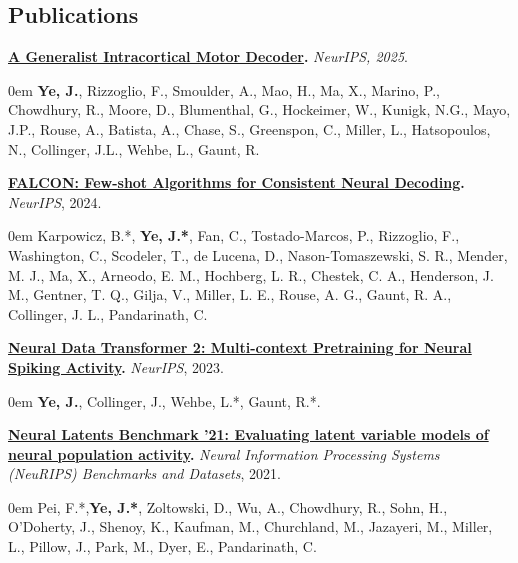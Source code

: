 \subsection*{Publications}

    \textbf{\href{https://www.biorxiv.org/content/10.1101/2024.09.15.613126v2}
    {A Generalist Intracortical Motor Decoder}.} \emph{NeurIPS, 2025}.

    \begin{addmargin}[1em]{0em}
        \textbf{Ye, J.}, Rizzoglio, F., Smoulder, A., Mao, H., Ma, X., Marino, P., Chowdhury, R., Moore, D., Blumenthal, G., Hockeimer, W., Kunigk, N.G., Mayo, J.P., Rouse, A., Batista, A., Chase, S., Greenspon, C., Miller, L., Hatsopoulos, N., Collinger, J.L., Wehbe, L., Gaunt, R.
    \end{addmargin}


    \textbf{\href{https://www.biorxiv.org/content/10.1101/2024.09.15.613126v2}
    {FALCON: Few-shot Algorithms for Consistent Neural Decoding}.} \emph{NeurIPS}, 2024.

    \begin{addmargin}[1em]{0em}
        Karpowicz, B.*, \textbf{Ye, J.*}, Fan, C., Tostado-Marcos, P., Rizzoglio, F., Washington, C., Scodeler, T., de Lucena, D., Nason-Tomaszewski, S. R., Mender, M. J., Ma, X., Arneodo, E. M., Hochberg, L. R., Chestek, C. A., Henderson, J. M., Gentner, T. Q., Gilja, V., Miller, L. E., Rouse, A. G., Gaunt, R. A., Collinger, J. L., Pandarinath, C.
    \end{addmargin}
    \textbf{\href{https://www.biorxiv.org/content/10.1101/2023.09.18.558113v1}
    {Neural Data Transformer 2: Multi-context Pretraining for Neural Spiking Activity}.} \emph{NeurIPS}, 2023.

    \begin{addmargin}[1em]{0em}
        \textbf{Ye, J.}, Collinger, J., Wehbe, L.*, Gaunt, R.*.
    \end{addmargin}

    \textbf{\href{https://arxiv.org/abs/2109.04463}{Neural Latents Benchmark '21: Evaluating latent variable models of neural population activity}.}
    \emph{Neural Information Processing Systems (NeuRIPS) Benchmarks and Datasets}, 2021.

    \begin{addmargin}[1em]{0em}%
        Pei, F.*,\textbf{Ye, J.*}, Zoltowski, D., Wu, A., Chowdhury, R., Sohn, H., O’Doherty, J., Shenoy, K., Kaufman, M., Churchland, M., Jazayeri, M., Miller, L., Pillow, J., Park, M., Dyer, E., Pandarinath, C.
    \end{addmargin}

